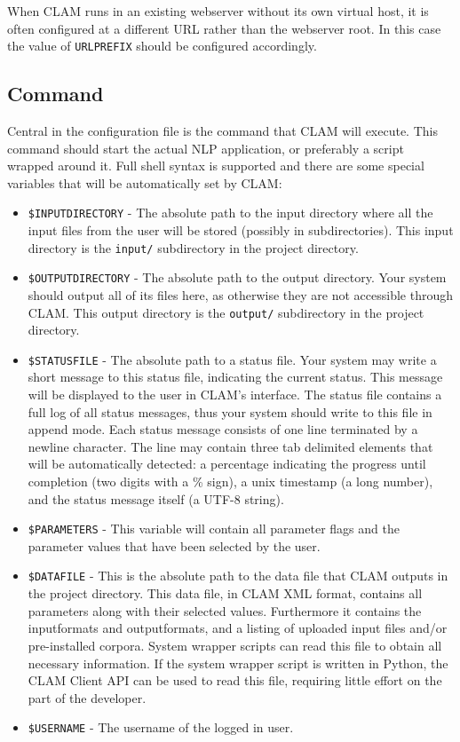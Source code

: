\documentclass[a4paper,12pt]{report}
\begin{document}
When CLAM runs in an existing webserver without its own virtual host, it is often configured at a different URL rather than the webserver root. In this case the value of \texttt{URLPREFIX} should be configured accordingly.


\subsection{Command}
\label{sec:command}

Central in the configuration file is the command that CLAM will execute. This command should start the actual NLP application, or preferably a script wrapped around it. Full shell syntax is supported and there are some special variables that will be automatically set by CLAM:

\begin{itemize}
\item \texttt{\$INPUTDIRECTORY} - The absolute path to the input directory where all the input files from the user will be stored (possibly in subdirectories). This input directory is the \texttt{input/} subdirectory in the project directory.
\item \texttt{\$OUTPUTDIRECTORY} - The absolute path to the output directory. Your system should output all of its files here, as otherwise they are not accessible through CLAM.  This output directory is the \texttt{output/} subdirectory in the project directory.
\item \texttt{\$STATUSFILE} - The absolute path to a status file. Your system may write a short message to this status file, indicating the current status. This message will be displayed to the user in CLAM's interface. The status file contains a full log of all status messages, thus your system should write to this file in append mode. Each status message consists of one line terminated by a newline character. The line may contain three tab delimited elements that will be automatically detected: a percentage indicating the progress until completion (two digits with a \% sign), a unix timestamp (a long number), and the status message itself (a UTF-8 string).
\item \texttt{\$PARAMETERS} - This variable will contain all parameter flags and the parameter values that have been selected by the user.  
\item \texttt{\$DATAFILE} - This is the absolute path to the data file that CLAM outputs in the project directory. This data file, in CLAM XML format, contains all parameters along with their selected values. Furthermore it contains the inputformats and outputformats, and a listing of uploaded input files and/or pre-installed corpora. System wrapper scripts can read this file to obtain all necessary information. If the system wrapper script is written in Python, the CLAM Client API can be used to read this file, requiring little effort on the part of the developer.
\item \texttt{\$USERNAME} - The username of the logged in user.
\end{itemize}
\end{document}
